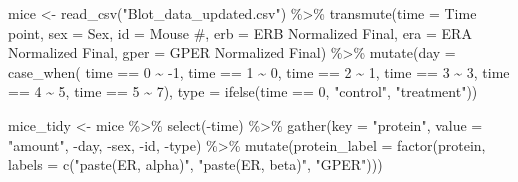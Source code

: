 \documentclass[12pt,twoside]{reedthesis}
\newenvironment{Shaded}{\begin{snugshade}}{\end{snugshade}}
\newcommand{\AttributeTok}[1]{\textcolor[rgb]{0.77,0.63,0.00}{#1}}
\newcommand{\DecValTok}[1]{\textcolor[rgb]{0.00,0.00,0.81}{#1}}
\newcommand{\FunctionTok}[1]{\textcolor[rgb]{0.00,0.00,0.00}{#1}}
\newcommand{\NormalTok}[1]{#1}
\newcommand{\OtherTok}[1]{\textcolor[rgb]{0.56,0.35,0.01}{#1}}
\newcommand{\SpecialCharTok}[1]{\textcolor[rgb]{0.00,0.00,0.00}{#1}}
\newcommand{\StringTok}[1]{\textcolor[rgb]{0.31,0.60,0.02}{#1}}
\begin{document}
\begin{Shaded}
\begin{Highlighting}[]
\NormalTok{mice }\OtherTok{\textless{}{-}} \FunctionTok{read\_csv}\NormalTok{(}\StringTok{"Blot\_data\_updated.csv"}\NormalTok{) }\SpecialCharTok{\%\textgreater{}\%}
  \FunctionTok{transmute}\NormalTok{(}\AttributeTok{time =} \StringTok{\textasciigrave{}}\AttributeTok{Time point}\StringTok{\textasciigrave{}}\NormalTok{,}
            \AttributeTok{sex =}\NormalTok{ Sex, }
            \AttributeTok{id =} \StringTok{\textasciigrave{}}\AttributeTok{Mouse \#}\StringTok{\textasciigrave{}}\NormalTok{, }
            \AttributeTok{erb =} \StringTok{\textasciigrave{}}\AttributeTok{ERB Normalized Final}\StringTok{\textasciigrave{}}\NormalTok{, }
            \AttributeTok{era =} \StringTok{\textasciigrave{}}\AttributeTok{ERA Normalized Final}\StringTok{\textasciigrave{}}\NormalTok{, }
            \AttributeTok{gper =} \StringTok{\textasciigrave{}}\AttributeTok{GPER Normalized Final}\StringTok{\textasciigrave{}}\NormalTok{) }\SpecialCharTok{\%\textgreater{}\%}
  \FunctionTok{mutate}\NormalTok{(}\AttributeTok{day =} \FunctionTok{case\_when}\NormalTok{(}
\NormalTok{    time }\SpecialCharTok{==} \DecValTok{0} \SpecialCharTok{\textasciitilde{}} \SpecialCharTok{{-}}\DecValTok{1}\NormalTok{,}
\NormalTok{    time }\SpecialCharTok{==} \DecValTok{1} \SpecialCharTok{\textasciitilde{}} \DecValTok{0}\NormalTok{,}
\NormalTok{    time }\SpecialCharTok{==} \DecValTok{2} \SpecialCharTok{\textasciitilde{}} \DecValTok{1}\NormalTok{,}
\NormalTok{    time }\SpecialCharTok{==} \DecValTok{3} \SpecialCharTok{\textasciitilde{}} \DecValTok{3}\NormalTok{,}
\NormalTok{    time }\SpecialCharTok{==} \DecValTok{4} \SpecialCharTok{\textasciitilde{}} \DecValTok{5}\NormalTok{,}
\NormalTok{    time }\SpecialCharTok{==} \DecValTok{5} \SpecialCharTok{\textasciitilde{}} \DecValTok{7}\NormalTok{),}
  \AttributeTok{type =} \FunctionTok{ifelse}\NormalTok{(time }\SpecialCharTok{==} \DecValTok{0}\NormalTok{, }\StringTok{"control"}\NormalTok{, }\StringTok{"treatment"}\NormalTok{))}

\NormalTok{mice\_tidy }\OtherTok{\textless{}{-}}\NormalTok{ mice }\SpecialCharTok{\%\textgreater{}\%} 
  \FunctionTok{select}\NormalTok{(}\SpecialCharTok{{-}}\NormalTok{time) }\SpecialCharTok{\%\textgreater{}\%} 
  \FunctionTok{gather}\NormalTok{(}\AttributeTok{key =} \StringTok{"protein"}\NormalTok{, }\AttributeTok{value =} \StringTok{"amount"}\NormalTok{, }\SpecialCharTok{{-}}\NormalTok{day, }\SpecialCharTok{{-}}\NormalTok{sex, }\SpecialCharTok{{-}}\NormalTok{id, }\SpecialCharTok{{-}}\NormalTok{type) }\SpecialCharTok{\%\textgreater{}\%} 
  \FunctionTok{mutate}\NormalTok{(}\AttributeTok{protein\_label =} \FunctionTok{factor}\NormalTok{(protein,}
           \AttributeTok{labels =} \FunctionTok{c}\NormalTok{(}\StringTok{"paste(ER, alpha)"}\NormalTok{, }\StringTok{"paste(ER, beta)"}\NormalTok{, }\StringTok{"GPER"}\NormalTok{)))}
\end{Highlighting}
\end{Shaded}
\end{document}
